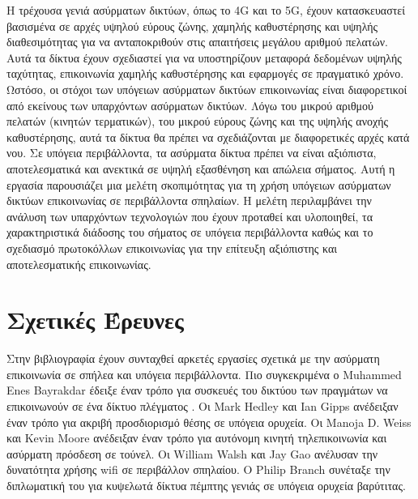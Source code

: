 \documentclass[12pt]{article}
\begin{document}
\begin{multicols}{2}
        Η τρέχουσα γενιά ασύρματων δικτύων, όπως το 4G και
        το 5G, έχουν κατασκευαστεί βασισμένα σε αρχές υψηλού
        εύρους ζώνης, χαμηλής καθυστέρησης και υψηλής
        διαθεσιμότητας για να ανταποκριθούν στις απαιτήσεις
        μεγάλου αριθμού πελατών. Αυτά τα δίκτυα έχουν
        σχεδιαστεί για να υποστηρίζουν μεταφορά δεδομένων
        υψηλής ταχύτητας, επικοινωνία χαμηλής καθυστέρησης
        και εφαρμογές σε πραγματικό χρόνο.
        Ωστόσο, οι στόχοι των υπόγειων ασύρματων δικτύων
        επικοινωνίας είναι διαφορετικοί από εκείνους των
        υπαρχόντων ασύρματων δικτύων. Λόγω του μικρού
        αριθμού πελατών (κινητών τερματικών), του μικρού
        εύρους ζώνης και της
        υψηλής ανοχής καθυστέρησης, αυτά τα δίκτυα θα πρέπει
        να σχεδιάζονται με διαφορετικές αρχές κατά νου. Σε
        υπόγεια περιβάλλοντα, τα ασύρματα δίκτυα πρέπει να
        είναι αξιόπιστα, αποτελεσματικά και ανεκτικά σε
        υψηλή εξασθένηση και απώλεια σήματος.
        Αυτή η εργασία παρουσιάζει μια μελέτη σκοπιμότητας
        για τη χρήση υπόγειων ασύρματων δικτύων επικοινωνίας
        σε περιβάλλοντα σπηλαίων. Η μελέτη περιλαμβάνει την
        ανάλυση των υπαρχόντων τεχνολογιών που έχουν
        προταθεί και υλοποιηθεί, τα χαρακτηριστικά διάδοσης
        του σήματος σε υπόγεια περιβάλλοντα καθώς και το
        σχεδιασμό πρωτοκόλλων επικοινωνίας για την επίτευξη
        αξιόπιστης και αποτελεσματικής επικοινωνίας.

    \section{\normalsize \textsf{Σχετικές Έρευνες}} Στην
        βιβλιογραφία έχουν συνταχθεί αρκετές εργασίες
        σχετικά με την ασύρματη επικοινωνία σε σπήλεα
        και υπόγεια περιβάλλοντα. Πιο συγκεκριμένα ο
        Muhammed Enes Bayrakdar έδειξε έναν τρόπο για
        συσκευές του δικτύου των πραγμάτων να
        επικοινωνούν σε ένα δίκτυο πλέγματος \citation. 
        Οι Mark Hedley και
        Ian Gipps ανέδειξαν έναν τρόπο για ακριβή
        προσδιορισμό θέσης σε υπόγεια ορυχεία. Οι Manoja
        D. Weiss και Kevin Moore ανέδειξαν έναν τρόπο
        για αυτόνομη κινητή τηλεπικοινωνία και ασύρματη
        πρόσδεση σε τούνελ. Οι William Walsh και Jay Gao
        ανέλυσαν την δυνατότητα χρήσης wifi σε
        περιβάλλον σπηλαίου. Ο Philip Branch συνέταξε
        την διπλωματική του για κυψελωτά δίκτυα πέμπτης
        γενιάς σε υπόγεια ορυχεία βαρύτιτας.


\end{multicols}
\end{document}
